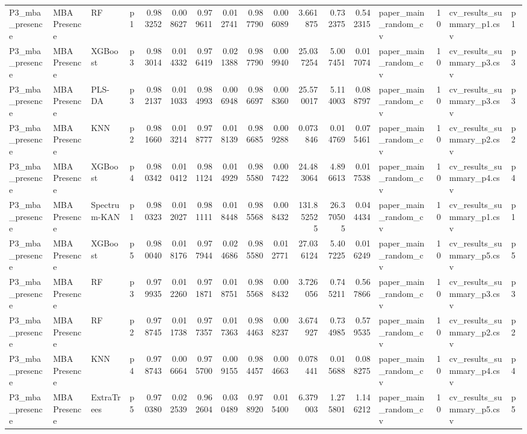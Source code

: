 \begin{tabular}{llllrrrrrrrrrlrll}
P3_mba_presence & MBA Presence & RF & p1 & 0.983252 & 0.008627 & 0.979611 & 0.012741 & 0.987790 & 0.006089 & 3.661875 & 0.732375 & 0.542315 & paper_main_random_cv & 10 & cv_results_summary_p1.csv & p1 \\
P3_mba_presence & MBA Presence & XGBoost & p3 & 0.983014 & 0.014332 & 0.976419 & 0.021388 & 0.987790 & 0.009940 & 25.037254 & 5.007451 & 0.017074 & paper_main_random_cv & 10 & cv_results_summary_p3.csv & p3 \\
P3_mba_presence & MBA Presence & PLS-DA & p3 & 0.982137 & 0.011033 & 0.984993 & 0.006948 & 0.986697 & 0.008360 & 25.570017 & 5.114003 & 0.088797 & paper_main_random_cv & 10 & cv_results_summary_p3.csv & p3 \\
P3_mba_presence & MBA Presence & KNN & p2 & 0.981660 & 0.013214 & 0.978777 & 0.018139 & 0.986685 & 0.009288 & 0.073846 & 0.014769 & 0.075461 & paper_main_random_cv & 10 & cv_results_summary_p2.csv & p2 \\
P3_mba_presence & MBA Presence & XGBoost & p4 & 0.980342 & 0.010412 & 0.981124 & 0.014929 & 0.985580 & 0.007422 & 24.483064 & 4.896613 & 0.017538 & paper_main_random_cv & 10 & cv_results_summary_p4.csv & p4 \\
P3_mba_presence & MBA Presence & Spectrum-KAN & p1 & 0.980323 & 0.012027 & 0.981111 & 0.018448 & 0.985568 & 0.008432 & 131.852525 & 26.370505 & 0.044434 & paper_main_random_cv & 10 & cv_results_summary_p1.csv & p1 \\
P3_mba_presence & MBA Presence & XGBoost & p5 & 0.980040 & 0.018176 & 0.977944 & 0.024686 & 0.985580 & 0.012771 & 27.036124 & 5.407225 & 0.016249 & paper_main_random_cv & 10 & cv_results_summary_p5.csv & p5 \\
P3_mba_presence & MBA Presence & RF & p3 & 0.979935 & 0.012260 & 0.971871 & 0.018751 & 0.985568 & 0.008432 & 3.726056 & 0.745211 & 0.567866 & paper_main_random_cv & 10 & cv_results_summary_p3.csv & p3 \\
P3_mba_presence & MBA Presence & RF & p2 & 0.978745 & 0.011738 & 0.977357 & 0.017363 & 0.984463 & 0.008237 & 3.674927 & 0.734985 & 0.579535 & paper_main_random_cv & 10 & cv_results_summary_p2.csv & p2 \\
P3_mba_presence & MBA Presence & KNN & p4 & 0.978743 & 0.006664 & 0.975700 & 0.009155 & 0.984457 & 0.004663 & 0.078441 & 0.015688 & 0.088275 & paper_main_random_cv & 10 & cv_results_summary_p4.csv & p4 \\
P3_mba_presence & MBA Presence & ExtraTrees & p5 & 0.970380 & 0.022539 & 0.962604 & 0.030489 & 0.978920 & 0.015400 & 6.379003 & 1.275801 & 1.146212 & paper_main_random_cv & 10 & cv_results_summary_p5.csv & p5 \\

\end{tabular}
